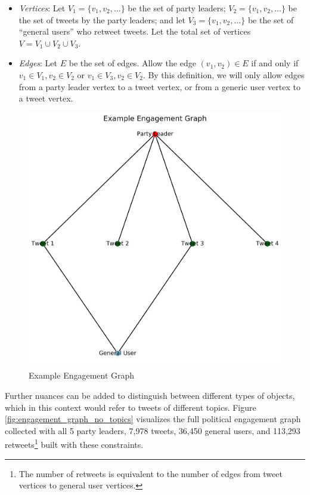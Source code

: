\begin{itemize}
  \item \emph{Vertices}: Let $V_{1}=\{v_{1},v_{2},\dots\}$ be the set of
  party leaders; $V_{2}=\{v_{1},v_{2},\dots\}$ be the set of tweets by the
  party leaders; and let
  $V_{3}=\{v_{1},v_{2},\dots\}$ be the set of ``general users'' who
  retweet tweets. Let the total set of vertices $V=V_{1}\cup V_{2}\cup V_{3}$.
  
  \item \emph{Edges}: Let $E$ be the set of edges. Allow the edge $(v_{1},
  v_{2})\in E$ if and only if $v_{1}\in V_{1}, v_{2}\in V_{2}$ or $v_{1}\in
  V_{3}, v_{2}\in V_{2}$. By this definition, we will only allow edges from a
  party leader vertex to a tweet vertex, or from a generic user vertex to a
  tweet vertex.
\end{itemize}

\begin{figure}[h!]
  \centering
  \includegraphics[scale=0.2]{figures/ex_engagement_graph}
  \caption[Example Engagement Graph]{Example Engagement Graph}
  \label{fig:ex_engagement_graph}
\end{figure}

Further nuances can be added to distinguish between different types of objects,
which in this context would refer to tweets of different topics. Figure
\ref{fig:engagement_graph_no_topics}  visualizes the full political engagement
graph collected with all 5 party leaders, 7,978 tweets, 36,450 general users,
and 113,293 retweets\footnote{The number of retweets is equivalent to the number
of edges from tweet vertices to general user vertices.} built with these constraints.

